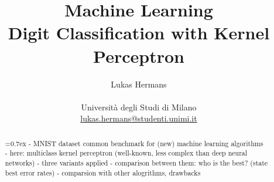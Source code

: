 \title{\large Machine Learning \\ \LARGE
 Digit Classification with Kernel Perceptron}
\author{Lukas Hermans\\ \\
{Università degli Studi di Milano} \\
\href{mailto:lukas.hermans@studenti.unimi.it}
{lukas.hermans@studenti.unimi.it}}

\maketitle

\begin{abstract} 
\noindent
{}\font=0.7ex%
- MNIST dataset common benchmark for (new) machine learning algorithms\\
- here: multiclass kernel perceptron (well-known, less complex than deep neural networks)
- three variants applied
- comparison between them: who is the best? (state best error rates)
- comparsion with other alogrithms, drawbacks
\end{abstract}
